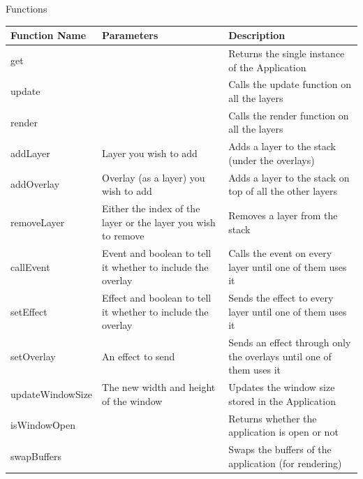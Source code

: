 \documentclass{article}
\begin{document}
\begin{center}
                    \clearpage
                    Functions
                    \begin{tabular}{ | m{} | m{}| m{} | }
                        \hline
                        \textbf{Function Name} & \textbf{Parameters} & \textbf{Description} \\
                        \hline
                        get & & Returns the single instance of the Application \\
                        \hline
                        update & & Calls the update function on all the layers \\
                        \hline
                        render & & Calls the render function on all the layers \\
                        \hline
                        addLayer & Layer you wish to add & Adds a layer to the stack (under the overlays)\\
                        \hline
                        addOverlay & Overlay (as a layer) you wish to add & Adds a layer to the stack on top of all the other layers \\
                        \hline
                        removeLayer & Either the index of the layer or the layer you wish to remove & Removes a layer from the stack \\
                        \hline
                        callEvent & Event and boolean to tell it whether to include the overlay & Calls the event on every layer until one of them uses it \\
                        \hline
                        setEffect & Effect and boolean to tell it whether to include the overlay & Sends the effect to every layer until one of them uses it \\
                        \hline
                        setOverlay & An effect to send & Sends an effect through only the overlays until one of them uses it \\
                        \hline
                        updateWindowSize & The new width and height of the window & Updates the window size stored in the Application \\
                        \hline
                        isWindowOpen & & Returns whether the application is open or not \\
                        \hline
                        swapBuffers & & Swaps the buffers of the application (for rendering) \\

\end{tabular}
\end{center}
\end{document}
